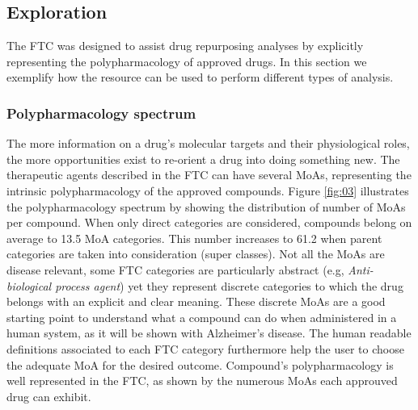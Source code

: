 \documentclass{bioinfo}
\begin{document}
\subsection{Exploration}\label{exploration}
The FTC was designed to assist drug repurposing analyses by explicitly representing the polypharmacology of 
approved drugs. In this section we exemplify how the resource can be used to perform different types of analysis.

\subsubsection{Polypharmacology spectrum}
The more information on a drug’s molecular targets and their physiological roles, the more opportunities 
exist to re-orient a drug into doing something new. The therapeutic agents described in the FTC can have several MoAs, 
representing the intrinsic polypharmacology of the approved compounds. Figure \ref{fig:03} illustrates the polypharmacology 
spectrum by showing the distribution of number of MoAs per compound. When only direct categories are considered, compounds belong on average
to 13.5 MoA categories. This number increases to 61.2 when parent categories are taken into consideration (super classes).
Not all the MoAs are disease relevant, 
some FTC categories are particularly abstract (e.g, \emph{Anti-biological process agent}) yet they represent discrete 
categories to which the drug belongs with an explicit and clear meaning. These discrete MoAs are a good starting 
point to understand what a compound can do when administered in a human system, as it will be shown with Alzheimer's disease.
The human readable definitions 
associated to each FTC category furthermore help the user to choose the adequate MoA for the desired outcome.
Compound's polypharmacology is 
well represented in the FTC, as shown by the numerous MoAs each approuved drug can exhibit.
\end{document}
